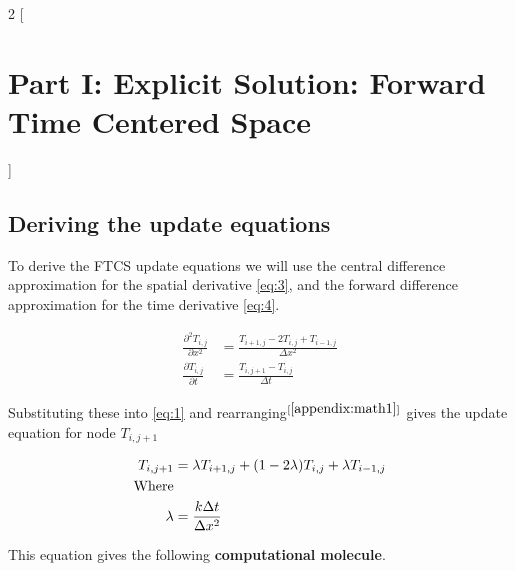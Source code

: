 \documentclass[a4paper]{article} %
\begin{document}
\begin{multicols}{2}
[
\section{Part I: Explicit Solution: Forward Time Centered Space }
]
\subsection{Deriving the update equations}
To derive the FTCS update equations we will use the central difference approximation for the spatial derivative \eqref{eq:3}, and the forward difference approximation for the time derivative \eqref{eq:4}.

\begin{align} 
\frac{\partial^2{T_{i,j}}}{\partial x^2} &= \frac{T_{i+1,j} - 2T_{i,j} + T_{i-1,j}}{\Delta x^2}\label{eq:3} \\
\frac{\partial{T_{i,j}}}{\partial t} &= \frac{T_{i,j+1} - T_{i,j}}{\Delta t}\label{eq:4}
\end{align}

Substituting these into \eqref{eq:1} and rearranging$^{[\rm{\ref{appendix:math1}}]}$ gives the update equation for node $T_{i,j+1}$

\begin{align}\label{eq:5}
T_{i,j+1} &= \lambda T_{i+1,j} + (1 - 2 \lambda)T_{i,j} + \lambda T_{i-1,j} \\
\rm{Where} & \notag \\
\lambda &= \frac{k\Delta t}{\Delta x^2} \notag
\end{align}

This equation gives the following \textbf{computational molecule}.

\begin{figure}[H]
    \centering
{}
\end{figure}
\end{multicols}
\end{document}
